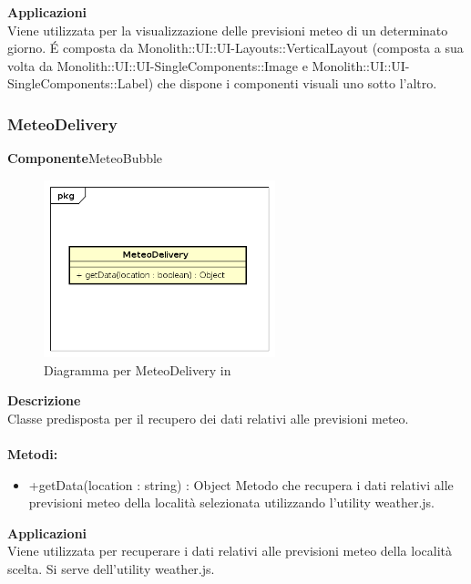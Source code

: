 \textbf{Applicazioni}\\
Viene utilizzata per la visualizzazione delle previsioni meteo di un determinato giorno. \'E composta da Monolith::UI::UI-Layouts::VerticalLayout (composta a sua volta da Monolith::UI::UI-SingleComponents::Image e Monolith::UI::UI-SingleComponents::Label) che dispone i componenti visuali uno sotto l'altro. 


\clearpage

\subsubsection{MeteoDelivery}
\textbf{Componente}MeteoBubble\\
   \FloatBarrier
   \begin{figure}[ht]
   \centering
   \includegraphics[width=0.6\textwidth]{img/single-MeteoDelivery}
   \caption{{Diagramma per MeteoDelivery in }}
\end{figure}
\FloatBarrier
\textbf{Descrizione}\\
Classe predisposta per il recupero dei dati relativi alle previsioni meteo.
\\
\\
\textbf{Metodi:} 
\begin{itemize}
\item +getData(location : string) : Object
Metodo che recupera i dati relativi alle previsioni meteo della località selezionata utilizzando l'utility weather.js.

\end{itemize} 


\textbf{Applicazioni}\\
Viene utilizzata per recuperare i dati relativi alle previsioni meteo della località scelta. Si serve dell'utility weather.js. 


\clearpage


